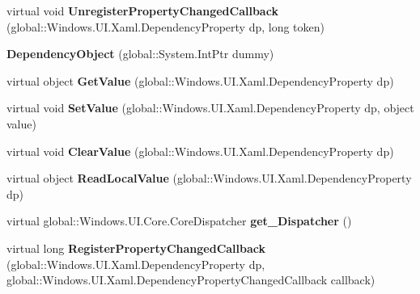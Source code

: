 \begin{DoxyCompactItemize}
virtual void {\bfseries Unregister\+Property\+Changed\+Callback} (global\+::\+Windows.\+U\+I.\+Xaml.\+Dependency\+Property dp, long token)
\item 
\mbox{\label{class_windows_1_1_u_i_1_1_xaml_1_1_dependency_object_a50ca400c3d5d8fb25c7f568083aab1b9}} 
{\bfseries Dependency\+Object} (global\+::\+System.\+Int\+Ptr dummy)
\item 
\mbox{\label{class_windows_1_1_u_i_1_1_xaml_1_1_dependency_object_ab7542d3826e3529750a867a66f41f33f}} 
virtual object {\bfseries Get\+Value} (global\+::\+Windows.\+U\+I.\+Xaml.\+Dependency\+Property dp)
\item 
\mbox{\label{class_windows_1_1_u_i_1_1_xaml_1_1_dependency_object_afbd5da79518b87e7eda7210ee248e8e2}} 
virtual void {\bfseries Set\+Value} (global\+::\+Windows.\+U\+I.\+Xaml.\+Dependency\+Property dp, object value)
\item 
\mbox{\label{class_windows_1_1_u_i_1_1_xaml_1_1_dependency_object_aae39f9b4dad56dfde575dd48bed82cd3}} 
virtual void {\bfseries Clear\+Value} (global\+::\+Windows.\+U\+I.\+Xaml.\+Dependency\+Property dp)
\item 
\mbox{\label{class_windows_1_1_u_i_1_1_xaml_1_1_dependency_object_adc36478eb501a1771f6d147333560730}} 
virtual object {\bfseries Read\+Local\+Value} (global\+::\+Windows.\+U\+I.\+Xaml.\+Dependency\+Property dp)
\item 
\mbox{\label{class_windows_1_1_u_i_1_1_xaml_1_1_dependency_object_a508c7b4f0ff4fbffc03e3c15071bccad}} 
virtual global\+::\+Windows.\+U\+I.\+Core.\+Core\+Dispatcher {\bfseries get\+\_\+\+Dispatcher} ()
\item 
\mbox{\label{class_windows_1_1_u_i_1_1_xaml_1_1_dependency_object_ab58e52b043959b48f59e0631b15126f7}} 
virtual long {\bfseries Register\+Property\+Changed\+Callback} (global\+::\+Windows.\+U\+I.\+Xaml.\+Dependency\+Property dp, global\+::\+Windows.\+U\+I.\+Xaml.\+Dependency\+Property\+Changed\+Callback callback)

\end{DoxyCompactItemize}
